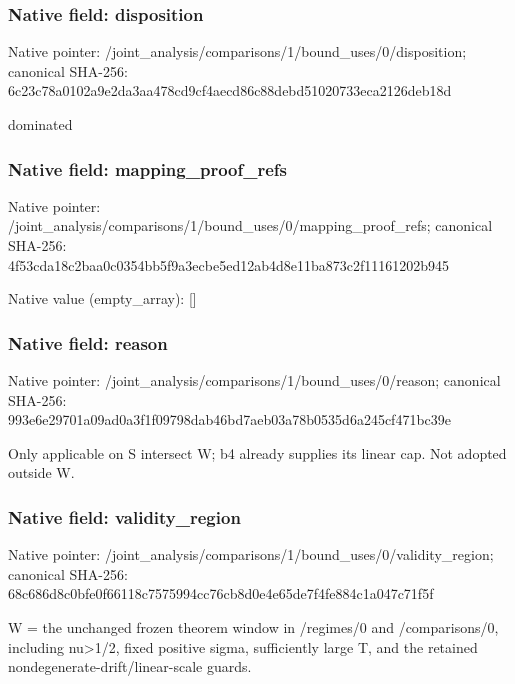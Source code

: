 \documentclass[10pt,a4paper]{article}
\begin{document}
\subsubsection{Native field: disposition}
Native pointer: /joint\_\allowbreak{}analysis/comparisons/1/bound\_\allowbreak{}uses/0/disposition; canonical SHA-256: 6c23c78a0102a9e2da3aa478cd9cf4aecd86c88debd51020733eca2126deb18d

\begingroup\raggedright\sloppy dominated\par\endgroup

\subsubsection{Native field: mapping\_\allowbreak{}proof\_\allowbreak{}refs}
Native pointer: /joint\_\allowbreak{}analysis/comparisons/1/bound\_\allowbreak{}uses/0/mapping\_\allowbreak{}proof\_\allowbreak{}refs; canonical SHA-256: 4f53cda18c2baa0c0354bb5f9a3ecbe5ed12ab4d8e11ba873c2f11161202b945

Native value (empty\_\allowbreak{}array): []

\subsubsection{Native field: reason}
Native pointer: /joint\_\allowbreak{}analysis/comparisons/1/bound\_\allowbreak{}uses/0/reason; canonical SHA-256: 993e6e29701a09ad0a3f1f09798dab46bd7aeb03a78b0535d6a245cf471bc39e

\begingroup\raggedright\sloppy Only applicable on S intersect W;\allowbreak{} b4 already supplies its linear cap. Not adopted outside W.\par\endgroup

\subsubsection{Native field: validity\_\allowbreak{}region}
Native pointer: /joint\_\allowbreak{}analysis/comparisons/1/bound\_\allowbreak{}uses/0/validity\_\allowbreak{}region; canonical SHA-256: 68c686d8c0bfe0f66118c7575994cc76cb8d0e4e65de7f4fe884c1a047c71f5f

\begingroup\raggedright\sloppy W =\allowbreak{} the unchanged frozen theorem window in /\allowbreak{}regimes/\allowbreak{}0 and /\allowbreak{}comparisons/\allowbreak{}0,\allowbreak{} including nu>1/\allowbreak{}2,\allowbreak{} fixed positive sigma,\allowbreak{} sufficiently large T,\allowbreak{} and the retained nondegenerate-drift/\allowbreak{}linear-scale guards.\par\endgroup
\end{document}
